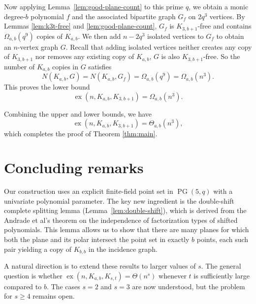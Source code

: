 \documentclass[11pt,a4paper]{article}
\theoremstyle{definition}
\theoremstyle{remark}
\newcommand{\ex}{\operatorname{ex}}
\newcommand{\PG}{\operatorname{PG}}
\begin{document}
Now applying Lemma~\ref{lem:good-plane-count} to this prime $q$, we obtain a monic degree-$b$ polynomial $f$ and the associated bipartite graph $G_f$ on $2q^3$ vertices. By Lemmas \ref{lem:k3t-free} and \ref{lem:good-plane-count}, $G_f$ is $K_{3,b+1}$-free and contains $\Omega_{a,b}(q^9)$ copies of $K_{a,b}$. We then add $n - 2q^3$ isolated vertices to $G_f$ to obtain an $n$-vertex graph $G$. Recall that adding isolated vertices neither creates any copy of $K_{3,b+1}$ nor removes any existing copy of $K_{a,b}$, $G$ is also $K_{3,b+1}$-free. So the number of $K_{a,b}$ copies in $G$ satisfies
\[
N(K_{a,b}, G) = N(K_{a,b}, G_f) = \Omega_{a,b}(q^9) = \Omega_{a,b}(n^3).
\]
This proves the lower bound
\[
\ex(n, K_{a,b}, K_{3,b+1}) = \Omega_{a,b}(n^3).
\]

Combining the upper and lower bounds, we have
\[
\ex(n, K_{a,b}, K_{3,b+1}) = \Theta_{a,b}(n^3),
\]
which completes the proof of Theorem \ref{thm:main}.


\section{Concluding remarks} \label{sec:concluding}



Our construction uses an explicit finite-field point set in $\PG(5, q)$ with a univariate 
polynomial parameter. The key new ingredient is the double-shift complete splitting 
lemma (Lemma~\ref{lem:double-shift}), which is derived from the Andrade et al's theorem on the independence of factorization types of 
shifted polynomials. This lemma allows us to show that there are many planes for which 
both the plane and its polar intersect the point set in exactly $b$ points, each such pair 
yielding a copy of $K_{b,b}$ in the incidence graph.


A natural direction is to extend these results to larger values of $s$. The 
general question is whether $\ex(n, K_{a,b}, K_{s,t}) = \Theta(n^s)$ whenever $t$ is 
sufficiently large compared to $b$. The cases $s = 2$ and $s = 3$ are now understood, 
but the problem for $s \geq 4$ remains open.
\end{document}
